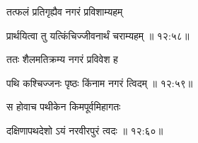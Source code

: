 {\devanagarifont तत्फलं प्रतिगृह्यैव नगरं प्रविशाम्यहम् \thinspace{\dandab} \dontdisplaylinenum }%


{\devanagarifont प्रार्थयित्वा तु यत्किंचिज्जीवनार्थं चराम्यहम् {॥ १२:५८॥} \veg\dontdisplaylinenum }%

{\devanagarifont ततः शैलमतिक्रम्य नगरं प्रविवेश ह \thinspace{\dandab} \dontdisplaylinenum }%
 

{\devanagarifont पथि कश्चिज्जनः पृष्ठः किंनाम नगरं त्विदम् {॥ १२:५९॥} \veg\dontdisplaylinenum }%

{\devanagarifont स होवाच पथीकेन किमपूर्वमिहागतः \thinspace{\dandab} \dontdisplaylinenum }%


{\devanagarifont दक्षिणापथदेशो ऽयं नरवीरपुरं त्वदः {॥ १२:६०॥} \veg\dontdisplaylinenum }%

